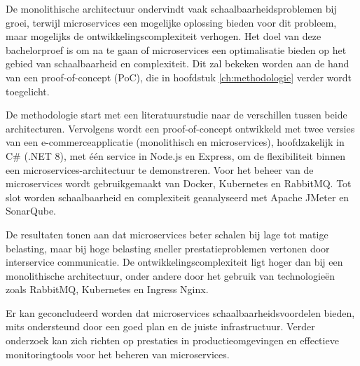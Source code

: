 De monolithische architectuur ondervindt vaak schaalbaarheidsproblemen bij groei, terwijl microservices een mogelijke oplossing bieden voor dit probleem, maar mogelijks de ontwikkelingscomplexiteit verhogen. Het doel van deze bachelorproef is om na te gaan of microservices een optimalisatie bieden op het gebied van schaalbaarheid en complexiteit. Dit zal bekeken worden aan de hand van een proof-of-concept (PoC), die in hoofdstuk \ref{ch:methodologie} verder wordt toegelicht.\newline

De methodologie start met een literatuurstudie naar de verschillen tussen beide architecturen. Vervolgens wordt een proof-of-concept ontwikkeld met twee versies van een e-commerceapplicatie (monolithisch en microservices), hoofdzakelijk in C\# (.NET 8), met één service in Node.js en Express, om de flexibiliteit binnen een microservices-architectuur te demonstreren. Voor het beheer van de microservices wordt gebruikgemaakt van Docker, Kubernetes en RabbitMQ. Tot slot worden schaalbaarheid en complexiteit geanalyseerd met Apache JMeter en SonarQube.\newline

De resultaten tonen aan dat microservices beter schalen bij lage tot matige belasting, maar bij hoge belasting sneller prestatieproblemen vertonen door interservice communicatie. De ontwikkelingscomplexiteit ligt hoger dan bij een monolithische architectuur, onder andere door het gebruik van technologieën zoals RabbitMQ, Kubernetes en Ingress Nginx.\newline

Er kan geconcludeerd worden dat microservices schaalbaarheidsvoordelen bieden, mits ondersteund door een goed plan en de juiste infrastructuur. Verder onderzoek kan zich richten op prestaties in productieomgevingen en effectieve monitoringtools voor het beheren van microservices.

